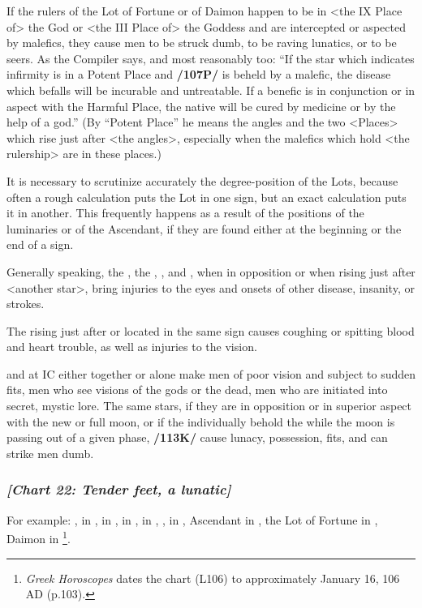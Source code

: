 If the rulers of the Lot of Fortune or of Daimon happen to be in <the IX Place of> the God or <the III Place of>
the Goddess and are intercepted or aspected by malefics, they cause men to be struck dumb, to be raving lunatics, or to be seers. As the Compiler says, and most reasonably too: “If the star which indicates infirmity is in a Potent Place and \textbf{/107P/} is beheld by a malefic, the disease which befalls will be incurable and untreatable. If a benefic is in conjunction or in aspect with the Harmful Place, the native will be cured by medicine or by the help of a god.” (By “Potent Place” he means the angles and the two <Places> which rise just after <the angles>, especially when the malefics which hold <the rulership> are in these places.) 

It is necessary to scrutinize accurately the degree-position of the Lots, because often a rough calculation puts the Lot in one sign, but an exact calculation puts it in another. This frequently happens as a result of the positions of the luminaries or of the Ascendant, if they are found either at the beginning or the end of a sign. 

Generally speaking, the \Sun, the \Moon, \Saturn, and \Mercury, when in opposition or when rising just after <another star>, bring injuries to the eyes and onsets of other disease, insanity, or strokes. 

The \Sun\xspace rising just after \Mars\xspace or located in the same sign causes coughing or spitting blood and heart trouble, as well as injuries to the vision. 

\Saturn\xspace and \Mars\xspace at IC either together or alone make men of poor vision and subject to sudden fits, men who see visions of the gods or the dead, men who are initiated into secret, mystic lore. The same stars, if they are in opposition or in superior aspect with the new or full moon, or if the individually behold the \Moon\xspace while the moon is passing out of a given phase, \textbf{/113K/} cause lunacy,
possession, fits, and can strike men dumb.

\newpage
\subsubsection{\textit{[Chart 22: Tender feet, a lunatic]}}
For example: \Sun, \Saturn\xspace in \Capricorn, \Moon\xspace in \Scorpio, \Jupiter\xspace in \Leo, \Mars\xspace in \Pisces, \Venus, \Mercury\xspace in \Aquarius, Ascendant in \Virgo, the Lot of Fortune in \Scorpio, Daimon in \Cancer
\footnote{\textit{Greek Horoscopes} dates the chart (L106) to approximately January 16, 106 AD (p.103).}.

